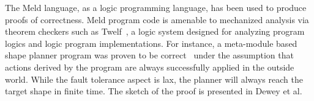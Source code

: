 The Meld language, as a logic programming language, has been used to produce
proofs of correctness. Meld program code is amenable to mechanized analysis via
theorem checkers such as Twelf~\cite{twelf}, a logic system designed for
analyzing program logics and logic program implementations.  For instance, a
meta-module based shape planner program was proven to be
correct~\cite{dewey-iros08,ashley-rollman-iclp09} under the assumption that
actions derived by the program are always successfully applied in the outside
world.  While the fault tolerance aspect is lax, the planner will always reach
the target shape in finite time.  The sketch of the proof is presented in Dewey
et al.~\cite{dewey-iros08}

